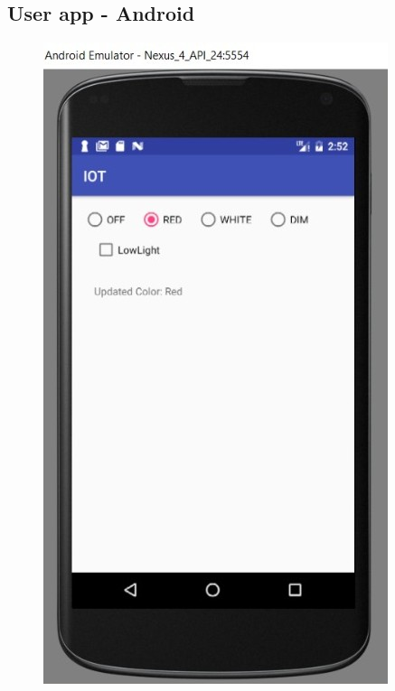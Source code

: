 \documentclass[conference]{IEEEtran}
\begin{document}
\subsection{User app - Android}

\begin{figure}[h]
	\begin{center}
		\includegraphics[width=1\linewidth]{img/androidapp}
		\caption{}
		\label{fig:fig2}
	\end{center}
\end{figure}
\end{document}
